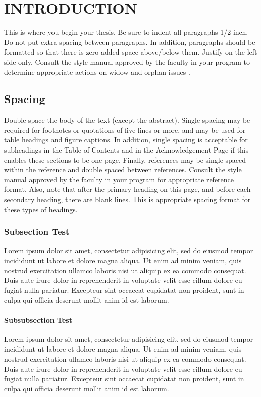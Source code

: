 \doublespacing

\chapter{INTRODUCTION}
This is where you begin your thesis. Be sure to indent all paragraphs 1/2 inch. Do not put extra spacing between paragraphs. In addition, paragraphs should be formatted so that there is zero added space above/below them. Justify on the left side only. Consult the style manual approved by the faculty in your program to determine appropriate actions on widow and orphan issues \cite{article-minimal}.

\section{Spacing}
Double space the body of the text (except the abstract). Single spacing may be required for footnotes or quotations of five lines or more, and may be used for table headings and figure captions. In addition, single spacing is acceptable for subheadings in the Table of Contents and in the Acknowledgement Page if this enables these sections to be one page. Finally, references may be single spaced within the reference and double spaced between references. Consult the style manual approved by the faculty in your program for appropriate reference format. Also, note that after the primary heading on this page, and before each secondary heading, there are blank lines. This is appropriate spacing format for these types of headings.

\subsection{Subsection Test}
Lorem ipsum dolor sit amet, consectetur adipisicing elit, sed do eiusmod
tempor incididunt ut labore et dolore magna aliqua. Ut enim ad minim veniam,
quis nostrud exercitation ullamco laboris nisi ut aliquip ex ea commodo
consequat. Duis aute irure dolor in reprehenderit in voluptate velit esse
cillum dolore eu fugiat nulla pariatur. Excepteur sint occaecat cupidatat non
proident, sunt in culpa qui officia deserunt mollit anim id est laborum.

\subsubsection{Subsubsection Test}
Lorem ipsum dolor sit amet, consectetur adipisicing elit, sed do eiusmod
tempor incididunt ut labore et dolore magna aliqua. Ut enim ad minim veniam,
quis nostrud exercitation ullamco laboris nisi ut aliquip ex ea commodo
consequat. Duis aute irure dolor in reprehenderit in voluptate velit esse
cillum dolore eu fugiat nulla pariatur. Excepteur sint occaecat cupidatat non
proident, sunt in culpa qui officia deserunt mollit anim id est laborum.


